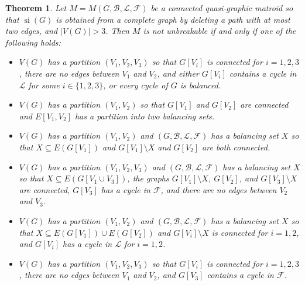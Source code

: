 \documentclass[12pt]{article}
\newtheorem{theorem}{Theorem}[section]
\theoremstyle{definition}
\theoremstyle{plain} %
\newcommand{\cB}{\mathcal{B}}
\newcommand{\cF}{\mathcal{F}}
\newcommand{\cL}{\mathcal{L}}
\DeclareMathOperator{\si}{si}
\newcommand{\del}{\!\setminus\!}
\begin{document}
\begin{theorem} \label{thm: structure of breakable complete quasi-graphic matroids}
Let $M = M(G, \cB, \cL, \cF)$ be a connected quasi-graphic matroid so that $\si(G)$ is obtained from a complete graph by deleting a path with at most two edges, and $|V(G)| > 3$.
Then $M$ is not unbreakable if and only if one of the following holds:
 \begin{itemize}
        \item[$(i)$] $V(G)$ has a partition $(V_1, V_2, V_3)$ so that $G[V_i]$ is connected for $i = 1,2,3$, there are no edges between $V_1$ and $V_2$, and either $G[V_i]$ contains a cycle in $\cL$ for some $i \in \{1,2,3\}$, or every cycle of $G$ is balanced.

        \item[$(ii)$] $V(G)$ has a partition $(V_1, V_2)$ so that $G[V_1]$ and $G[V_2]$ are connected and $E[V_1, V_2]$ has a partition into two balancing sets.

        \item[$(iii)$] $V(G)$ has a partition $(V_1, V_2)$ and $(G, \cB, \cL, \cF)$ has a balancing set $X$ so that $X \subseteq E(G[V_1])$ and $G[V_1] \del X$ and $G[V_2]$ are both connected.

        \item[$(iii)'$] $V(G)$ has a partition $(V_1, V_2, V_3)$ and $(G, \cB, \cL, \cF)$ has a balancing set $X$ so that $X \subseteq E(G[V_1 \cup V_3])$, the graphs $G[V_1]\del X$, $G[V_2]$, and $G[V_3] \del X$ are connected, $G[V_3]$ has a cycle in $\cF$, and there are no edges between $V_2$ and $V_3$. 
                

        \item[$(iv)$] $V(G)$ has a partition $(V_1, V_2)$ and $(G, \cB, \cL, \cF)$ has a balancing set $X$ so that $X \subseteq E(G[V_1]) \cup E(G[V_2])$ and $G[V_i]\del X$ is connected for $i = 1,2$, and $G[V_i]$ has a cycle in $\cL$ for $i = 1,2$.


        \item[$(v)$] $V(G)$ has a partition $(V_1, V_2, V_3)$ so that $G[V_i]$ is connected for $i = 1,2,3$, there are no edges between $V_1$ and $V_2$, and $G[V_3]$ contains a cycle in $\cF$.
    \end{itemize}
\end{theorem}
\end{document}
